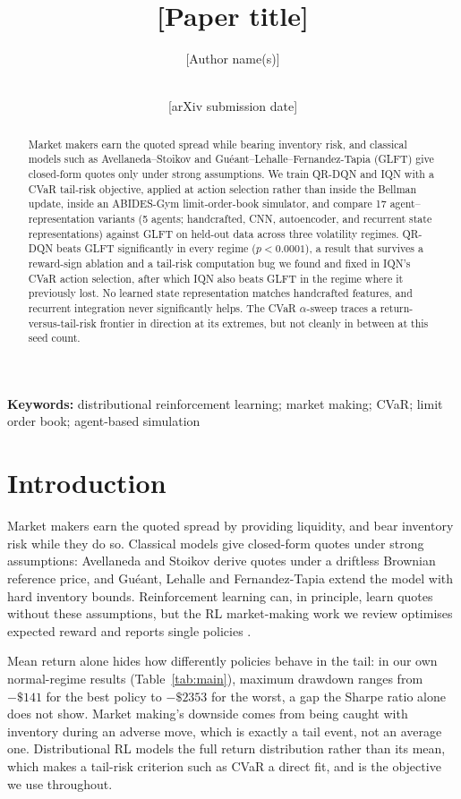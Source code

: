 \documentclass[10pt,twocolumn]{article}
\title{[Paper title]}
\author{[Author name(s)]\\[Affiliation]\\[Email]}
\date{[arXiv submission date]}
\begin{document}
\maketitle

\begin{abstract}
Market makers earn the quoted spread while bearing inventory risk, and classical models such as Avellaneda--Stoikov and Gu\'eant--Lehalle--Fernandez-Tapia (GLFT) give closed-form quotes only under strong assumptions. We train QR-DQN and IQN with a CVaR tail-risk objective, applied at action selection rather than inside the Bellman update, inside an ABIDES-Gym limit-order-book simulator, and compare 17 agent--representation variants (5 agents; handcrafted, CNN, autoencoder, and recurrent state representations) against GLFT on held-out data across three volatility regimes. QR-DQN beats GLFT significantly in every regime ($p<0.0001$), a result that survives a reward-sign ablation and a tail-risk computation bug we found and fixed in IQN's CVaR action selection, after which IQN also beats GLFT in the regime where it previously lost. No learned state representation matches handcrafted features, and recurrent integration never significantly helps. The CVaR $\alpha$-sweep traces a return-versus-tail-risk frontier in direction at its extremes, but not cleanly in between at this seed count.
\end{abstract}

\noindent\textbf{Keywords:} distributional reinforcement learning; market making; CVaR; limit order book; agent-based simulation

\section{Introduction}
Market makers earn the quoted spread by providing liquidity, and bear inventory risk while they do so. Classical models give closed-form quotes under strong assumptions: Avellaneda and Stoikov \citep{avellaneda2008} derive quotes under a driftless Brownian reference price, and Gu\'eant, Lehalle and Fernandez-Tapia \citep{gueant2012} extend the model with hard inventory bounds. Reinforcement learning can, in principle, learn quotes without these assumptions, but the RL market-making work we review optimises expected reward and reports single policies \citep{spooner2018,kumar2020}.

Mean return alone hides how differently policies behave in the tail: in our own normal-regime results (Table~\ref{tab:main}), maximum drawdown ranges from $-\$141$ for the best policy to $-\$2353$ for the worst, a gap the Sharpe ratio alone does not show. Market making's downside comes from being caught with inventory during an adverse move, which is exactly a tail event, not an average one. Distributional RL \citep{bellemare2017} models the full return distribution rather than its mean, which makes a tail-risk criterion such as CVaR a direct fit, and is the objective we use throughout.
\end{document}
